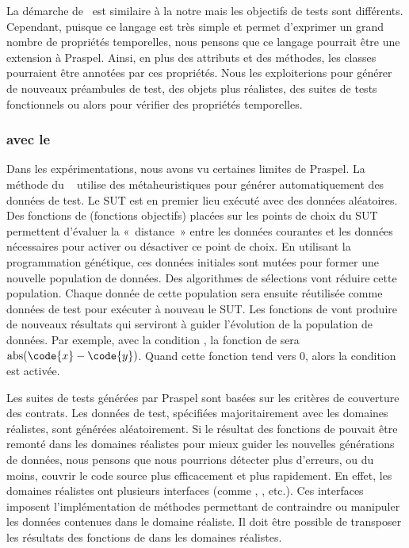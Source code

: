 La démarche de~ est similaire à la notre mais les objectifs
de tests sont différents. Cependant, puisque ce langage est très simple et
permet d'exprimer un grand nombre de propriétés temporelles, nous pensons que ce
langage pourrait être une extension à Praspel. Ainsi, en plus des attributs et
des méthodes, les classes pourraient être annotées par ces propriétés. Nous les
exploiterions pour générer de nouveaux préambules de test, des objets plus
réalistes, des suites de tests fonctionnels ou alors pour vérifier des
propriétés temporelles.

\subsubsection{ avec le }

Dans les expérimentations, nous avons vu certaines limites de Praspel. La
méthode du ~ utilise des
métaheuristiques pour générer automatiquement des données de test. Le SUT est en
premier lieu exécuté avec des données aléatoires. Des fonctions de
 (fonctions objectifs) placées sur les points de choix du SUT
permettent d'évaluer la «~distance~» entre les données courantes et les données
nécessaires pour activer ou désactiver ce point de choix. En utilisant la
programmation génétique, ces données initiales sont mutées pour former une
nouvelle population de données. Des algorithmes de sélections vont réduire cette
population. Chaque donnée de cette population sera ensuite réutilisée comme
données de test pour exécuter à nouveau le SUT. Les fonctions de
 vont produire de nouveaux résultats qui serviront à guider
l'évolution de la population de données. Par exemple, avec la condition , la fonction de  sera $\mathrm{abs}(\code{x} -
\code{y})$. Quand cette fonction tend vers 0, alors la condition est activée.

Les suites de tests générées par Praspel sont basées sur les critères de
couverture des contrats. Les données de test, spécifiées majoritairement avec
les domaines réalistes, sont générées aléatoirement. Si le résultat des
fonctions de  pouvait être remonté dans les domaines
réalistes pour mieux guider les nouvelles générations de données, nous pensons
que nous pourrions détecter plus d'erreurs, ou du moins, couvrir le code source
plus efficacement et plus rapidement. En effet, les domaines réalistes ont
plusieurs interfaces (comme , , 
etc.). Ces interfaces imposent l'implémentation de méthodes permettant de
contraindre ou manipuler les données contenues dans le domaine réaliste. Il doit
être possible de transposer les résultats des fonctions de 
dans les domaines réalistes.

